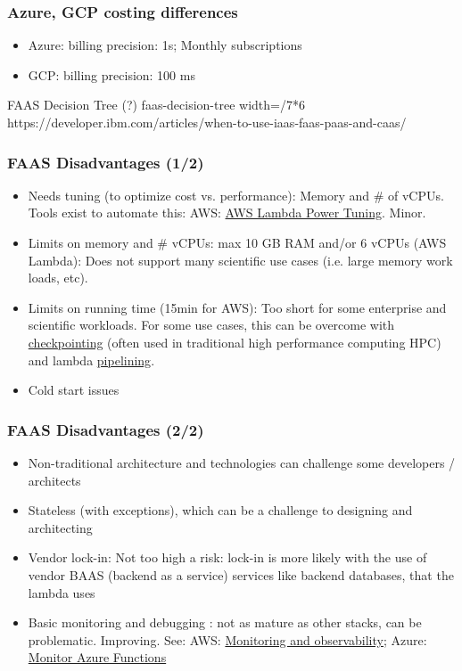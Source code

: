 \documentclass[11pt,aspectratio=169]{beamer}
\begin{document}
\begin{nrcanFrame}
  \frametitle{Azure, GCP costing differences}
  \begin{itemize}
  \item Azure: billing precision: 1s; Monthly subscriptions
  \item GCP: billing precision: 100 ms
    \end{itemize}
  \end{nrcanFrame}

\nrcanGraphicFrame
  {FAAS Decision Tree (?)}
  {faas-decision-tree}
  {width=\paperwidth/7*6}
  {https://developer.ibm.com/articles/when-to-use-iaas-faas-paas-and-caas/}


\begin{nrcanFrame}
  \frametitle{FAAS Disadvantages (1/2)}
    \begin{itemize}
    \item Needs tuning (to optimize cost vs. performance): Memory and \# of vCPUs.
      Tools exist to automate this: AWS:
      \href{https://docs.aws.amazon.com/lambda/latest/operatorguide/profile-functions.html}
           {AWS Lambda Power Tuning}. \alert{Minor}.
  \item Limits on memory and \# vCPUs: max 10 GB RAM and/or 6 vCPUs (AWS
    Lambda): Does not support many scientific use cases (i.e. large
    memory work loads, etc).
  \item Limits on running time (15min for AWS): Too short for some enterprise and scientific workloads.
    For some use cases, this can be overcome with \href{https://en.wikipedia.org/wiki/Application\_checkpointing}{checkpointing} (often used in traditional high performance computing HPC) and lambda \href{https://en.wikipedia.org/wiki/Pipeline\_(software)}{pipelining}.
  \item Cold start issues
    \end{itemize}
\end{nrcanFrame}

\begin{nrcanFrame}
  \frametitle{FAAS Disadvantages (2/2)}
    \begin{itemize}
  \item Non-traditional architecture and technologies can challenge
    some developers / architects
  \item Stateless (with exceptions), which can be a challenge to designing and architecting
  \item Vendor lock-in: Not too high a risk: lock-in is more likely
    with the use of vendor BAAS (backend as a service) services like
    backend databases, that the lambda uses
  \item Basic monitoring and debugging : not as mature as other stacks,
    can be problematic.
    Improving. See: AWS: \href{https://docs.aws.amazon.com/lambda/latest/operatorguide/monitoring-observability.html}{Monitoring and observability}; Azure: \href{https://docs.microsoft.com/en-us/azure/azure-functions/functions-monitoring}{Monitor Azure Functions}
    \end{itemize}
\end{nrcanFrame}
\end{document}
